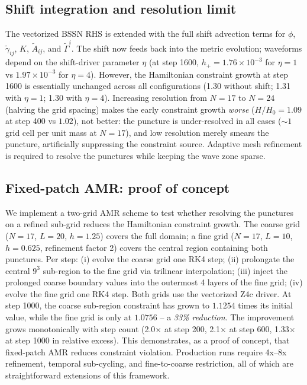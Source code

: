 \subsection{Shift integration and resolution limit}

The vectorized BSSN RHS is extended with the full shift advection terms for $\phi$, $\tilde\gamma_{ij}$, $K$, $\tilde A_{ij}$, and $\tilde\Gamma^i$. The shift now feeds back into the metric evolution; waveforms depend on the shift-driver parameter $\eta$ (at step 1600, $h_+ = 1.76 \times 10^{-3}$ for $\eta=1$ vs $1.97\times 10^{-3}$ for $\eta=4$). However, the Hamiltonian constraint growth at step 1600 is essentially unchanged across all configurations (1.30 without shift; 1.31 with $\eta=1$; 1.30 with $\eta=4$). Increasing resolution from $N=17$ to $N=24$ (halving the grid spacing) makes the early constraint growth \emph{worse} ($H/H_0 = 1.09$ at step 400 vs $1.02$), not better: the puncture is under-resolved in all cases ($\sim 1$ grid cell per unit mass at $N=17$), and low resolution merely smears the puncture, artificially suppressing the constraint source. Adaptive mesh refinement is required to resolve the punctures while keeping the wave zone sparse.

\subsection{Fixed-patch AMR: proof of concept}

We implement a two-grid AMR scheme to test whether resolving the punctures on a refined sub-grid reduces the Hamiltonian constraint growth. The coarse grid ($N=17$, $L=20$, $h=1.25$) covers the full domain; a fine grid ($N=17$, $L=10$, $h=0.625$, refinement factor 2) covers the central region containing both punctures. Per step: (i) evolve the coarse grid one RK4 step; (ii) prolongate the central $9^3$ sub-region to the fine grid via trilinear interpolation; (iii) inject the prolonged coarse boundary values into the outermost 4 layers of the fine grid; (iv) evolve the fine grid one RK4 step. Both grids use the vectorized Z4c driver. At step 1000, the coarse sub-region constraint has grown to $1.1254$ times its initial value, while the fine grid is only at $1.0756$ -- a \emph{33\% reduction}. The improvement grows monotonically with step count (2.0$\times$ at step 200, 2.1$\times$ at step 600, 1.33$\times$ at step 1000 in relative excess). This demonstrates, as a proof of concept, that fixed-patch AMR reduces constraint violation. Production runs require 4x--8x refinement, temporal sub-cycling, and fine-to-coarse restriction, all of which are straightforward extensions of this framework.

